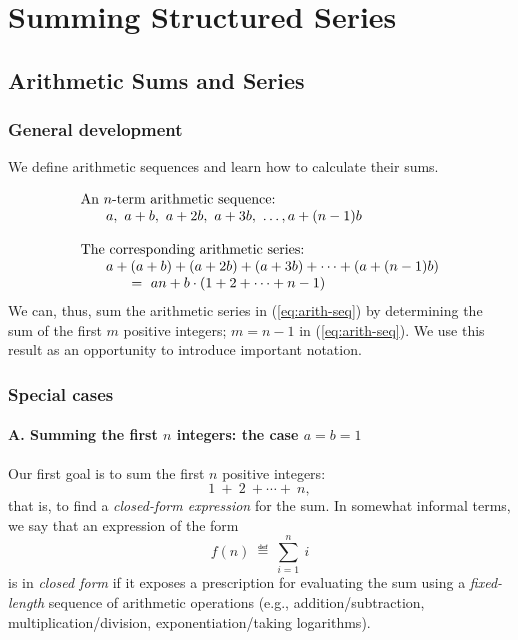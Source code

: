 \section{Summing Structured Series}
\label{sec:structured-series}

\subsection{Arithmetic Sums and Series}
\label{sec:arithmetic-series}

\subsubsection{General development}

We define arithmetic sequences and learn how to calculate their sums.

\begin{equation}
\label{eq:arith-seq}
\begin{array}{l}
\mbox{An $n$-term arithmetic sequence:} \\
\hspace*{.25in}a, \ a+b, \ a+2b, \ a+3b, \ \ldots, a+(n-1)b \\
\\
\mbox{The corresponding arithmetic series:} \\
\hspace*{.25in}a + (a+b) + (a+2b) + (a+3b) + \cdots + (a+(n-1)b) \\
\hspace*{.5in} = \
an + b \cdot (1 + 2 + \cdots + n-1)
\end{array}
\end{equation}
We can, thus, sum the arithmetic series in (\ref{eq:arith-seq}) by
determining the sum of the first $m$ positive integers; $m = n-1$ in
(\ref{eq:arith-seq}).  We use this result as an opportunity to
introduce important notation.

\subsubsection{Special cases}

\paragraph{\sf A. Summing the first $n$ integers: the case $a=b=1$}
Our first goal is to sum the first $n$ positive integers:
\[ 1 \ + \ 2 \ + \cdots + \ n , \]
that is, to find a {\it closed-form expression} 
for the sum.  In somewhat informal terms, we say that an expression of
the form
\[ f(n) \ \eqdef \ \sum_{i=1}^n \ i \]
is in {\it closed form} if it exposes a prescription for evaluating
the sum using a {\em fixed-length} sequence of arithmetic operations
(e.g., addition/subtraction, multiplication/division,
exponentiation/taking logarithms).

